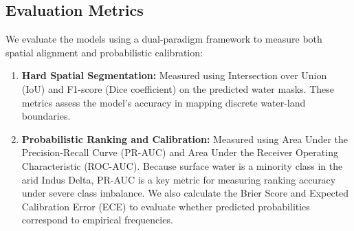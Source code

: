 \documentclass[journal]{IEEEtran}
\begin{document}
\begin{table}[!t]
\caption{Verified Model Hyperparameters and Architectural Specifications (\texttt{MFPIT\_Model.py})}
\label{tab:hyperparams}
\centering
{}
\end{table}

\subsection{Evaluation Metrics}
We evaluate the models using a dual-paradigm framework to measure both spatial alignment and probabilistic calibration:
\begin{enumerate}
    \item \textbf{Hard Spatial Segmentation:} Measured using Intersection over Union (IoU) and F1-score (Dice coefficient) on the predicted water masks. These metrics assess the model's accuracy in mapping discrete water-land boundaries.
    \item \textbf{Probabilistic Ranking and Calibration:} Measured using Area Under the Precision-Recall Curve (PR-AUC) and Area Under the Receiver Operating Characteristic (ROC-AUC). Because surface water is a minority class in the arid Indus Delta, PR-AUC is a key metric for measuring ranking accuracy under severe class imbalance. We also calculate the Brier Score and Expected Calibration Error (ECE) to evaluate whether predicted probabilities correspond to empirical frequencies.
\end{enumerate}
\end{document}
